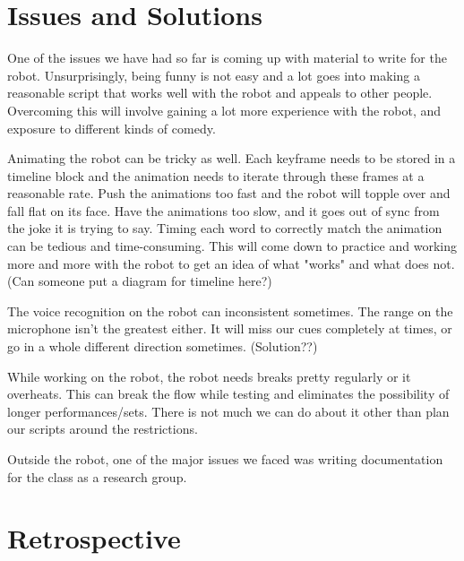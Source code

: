 \documentclass[onecolumn, draftclsnofoot,10pt, compsoc]{IEEEtran}
\begin{document}
\section{Issues and Solutions}
One of the issues we have had so far is coming up with material to write for the robot. Unsurprisingly, being funny is not easy and a lot goes into making a reasonable script that works well with the robot and appeals to other people. Overcoming this will involve gaining a lot more experience with the robot, and exposure to different kinds of comedy.

Animating the robot can be tricky as well. Each keyframe needs to be stored in a timeline block and the animation needs to iterate through these frames at a reasonable rate. Push the animations too fast and the robot will topple over and fall flat on its face. Have the animations too slow, and it goes out of sync from the joke it is trying to say. Timing each word to correctly match the animation can be tedious and time-consuming. This will come down to practice and working more and more with the robot to get an idea of what "works" and what does not.
(Can someone put a diagram for timeline here?)

The voice recognition on the robot can inconsistent sometimes. The range on the microphone isn't the greatest either. It will miss our cues completely at times, or go in a whole different direction sometimes. (Solution??)

While working on the robot, the robot needs breaks pretty regularly or it overheats. This can break the flow while testing and eliminates the possibility of longer performances/sets. There is not much we can do about it other than plan our scripts around the restrictions.

Outside the robot, one of the major issues we faced was writing documentation for the class as a research group.

\section{Retrospective}
\end{document}
